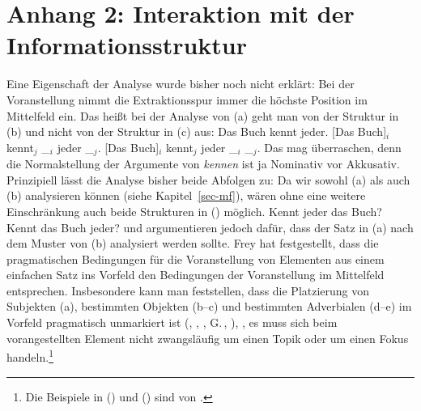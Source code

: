 \section{Anhang 2: Interaktion mit der Informationsstruktur}
\label{sec-udc-is}

Eine Eigenschaft der Analyse wurde bisher noch nicht erklärt: Bei der Voranstellung nimmt
die Extraktionsspur immer die höchste Position im Mittelfeld ein. Das heißt bei der Analyse
von (a) geht man von der Struktur in (b) und nicht von der Struktur in (c) aus:
\eal
\ex Das Buch kennt jeder.
\ex {}[Das Buch]$_i$ kennt$_j$ \_$_i$ jeder \_$_j$.
\ex {}[Das Buch]$_i$ kennt$_j$ jeder \_$_i$ \_$_j$.
\zl
Das mag überraschen, denn die Normalstellung der Argumente von \emph{kennen} ist ja Nominativ vor Akkusativ.
Prinzipiell lässt die Analyse bisher beide Abfolgen zu: Da wir sowohl (a) als auch (b)
analysieren können (siehe Kapitel~\ref{sec-mf}), wären ohne eine weitere Einschränkung
auch beide Strukturen in () möglich.%
\eal
\ex Kennt jeder das Buch?
\ex Kennt das Buch jeder?
\zl
\citet{Fanselow2003d} und \citet{Frey2004a} argumentieren jedoch dafür, dass der Satz in (a) nach dem
Muster von (b) analysiert werden sollte. Frey hat festgestellt, dass die pragmatischen
Bedingungen für die Voranstellung von Elementen aus einem einfachen Satz ins Vorfeld den Bedingungen der Voranstellung
im Mittelfeld entsprechen. Insbesondere kann man feststellen, dass die Platzierung von Subjekten (a), 
bestimmten Objekten (b--c) und bestimmten Adverbialen (d--e) im Vorfeld pragmatisch
unmarkiert 
ist (\citealp{Lenerz77}, \citealp[--74]{Haider84c}, \citealp{Fanselow2003d},
G.\,\citealp[]{GMueller2004a}, \citealp{Frey2004a}), 
\dash, es muss sich beim vorangestellten Element nicht zwangsläufig 
um einen Topik oder um einen Fokus handeln.\footnote{
  Die Beispiele in () und () sind von \citet[--6, 8]{Frey2004a}. 
}

